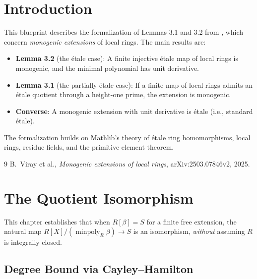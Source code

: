 
%

\chapter{Introduction}

This blueprint describes the formalization of Lemmas 3.1 and 3.2 from
\cite{monogenic}, which concern \emph{monogenic extensions} of local rings.
The main results are:

\begin{itemize}
\item \textbf{Lemma 3.2} (the étale case): A finite injective étale map of local rings
  is monogenic, and the minimal polynomial has unit derivative.
\item \textbf{Lemma 3.1} (the partially étale case): If a finite map of local rings
  admits an étale quotient through a height-one prime, the extension is monogenic.
\item \textbf{Converse}: A monogenic extension with unit derivative is étale
  (i.e., standard étale).
\end{itemize}

The formalization builds on Mathlib's theory of étale ring homomorphisms,
local rings, residue fields, and the primitive element theorem.

\begin{thebibliography}{9}
  B.~Viray et al.,
  \emph{Monogenic extensions of local rings},
  arXiv:2503.07846v2, 2025.
\end{thebibliography}


\chapter{The Quotient Isomorphism}
\label{ch:generator}

This chapter establishes that when $R[\beta] = S$ for a finite free extension,
the natural map $R[X]/(\operatorname{minpoly}_R \beta) \to S$ is an isomorphism,
\emph{without} assuming $R$ is integrally closed.

\section{Degree Bound via Cayley--Hamilton}

